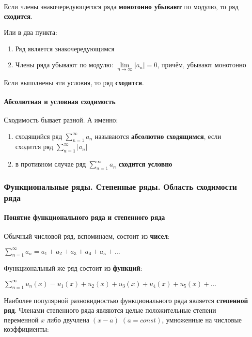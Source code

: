 \documentclass{article}
\begin{document}
Если члены знакочередующегося ряда \textbf{монотонно убывают} по модулю, то ряд \textbf{сходится}.

Или в два пункта:

\begin{enumerate}
    \item Ряд является знакочередующимся
    \item Члены ряда убывают по модулю: $\lim\limits_{n \to \infty} |a_{n}| = 0$, причём, убывают монотонно
\end{enumerate}

Если выполнены эти условия, то ряд \textbf{сходится}.

\paragraph{Абсолютная и условная сходимость}

Сходимость бывает разной. А именно:

\begin{enumerate}
    \item сходящийся ряд $\sum\limits_{n = 1}^{\infty} a_{n}$ называются \textbf{абсолютно сходящимся}, если сходится ряд $\sum\limits_{n = 1}^{\infty} |a_{n}|$
    \item в противном случае ряд $\sum\limits_{n = 1}^{\infty} a_{n}$ \textbf{сходится условно}
\end{enumerate}

\subsubsection{Функциональные ряды. Степенные ряды. Область сходимости ряда}

\paragraph{Понятие функционального ряда и степенного ряда}

Обычный числовой ряд, вспоминаем, состоит из \textbf{чисел}:

$\sum\limits_{n = 1}^{\infty} a_{n} = a_{1} + a_{2} + a_{3} + a_{4} + a_{5} + \dots$

Функциональный же ряд состоит из \textbf{функций}:

$\sum\limits_{n = 1}^{\infty} u_{n}(x) = u_{1}(x) + u_{2}(x) + u_{3}(x) + u_{4}(x) + u_{5}(x) + \dots$

Наиболее популярной разновидностью функционального ряда является \textbf{степенной ряд}. Членами степенного ряда являются целые положительные степени переменной $x$ либо двучлена $(x - a)$ $(a = const)$, умноженные на числовые коэффициенты:
\end{document}
